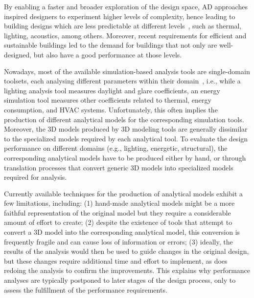 By enabling a faster and broader exploration of the design space, \ac{AD} approaches inspired designers to experiment higher levels of complexity, hence leading to building designs which are less predictable at different levels~\cite{Branco2017AD}, such as thermal, lighting, acoustics, among others. Moreover, recent requirements for efficient and sustainable buildings led to the demand for buildings that not only are well-designed, but also have a good performance at those levels.
	
	Nowadays, most of the available simulation-based analysis tools are single-domain toolsets, each analysing different parameters within their domain~\cite{Malkawi2005}, i.e., while a lighting analysis tool measures daylight and glare coefficients, an energy simulation tool measures other coefficients related to thermal, energy consumption, and \ac{HVAC} systems. Unfortunately, this often implies the production of different analytical models for the corresponding simulation tools. Moreover, the 3D models produced by 3D modeling tools are generally dissimilar to the specialized models required by each analytical tool. To evaluate the design performance on different domains (e.g., lighting, energetic, structural), the corresponding analytical models have to be produced either by hand, or through translation processes that convert generic 3D models into specialized models required for analysis.

	Currently available techniques for the production of analytical models exhibit a few limitations, including: (1) hand-made analytical models might be a more faithful representation of the original model but they require a considerable amount of effort to create; (2) despite the existence of tools that attempt to convert a 3D model into the corresponding analytical model, this conversion is frequently fragile and can cause loss of information or errors; (3) ideally, the results of the analysis would then be used to guide changes in the original design, but these changes require additional time and effort to implement, as does redoing the analysis to confirm the improvements. This explains why performance analyses are typically postponed to later stages of the design process, only to assess the fulfillment of the performance requirements.

